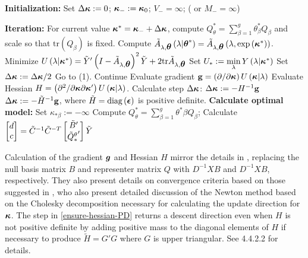 \begin{algorithm}[H]
\caption{ }
\begin{algorithmic}
\STATE \textbf{Initialization:} 
	\STATE Set $\Delta \mbox{\boldmath $\kappa$} := 0$; \;$\mbox{\boldmath $\kappa$}_{-}:=\mbox{\boldmath $\kappa$}_{0}$; \;$V_- = \infty$; \;( or $M_- = \infty$)

\STATE \textbf{Iteration:} 
		\STATE For current value $\mbox{\boldmath $\kappa$}^* = \mbox{\boldmath $\kappa$}_- + \Delta \mbox{\boldmath $\kappa$}$, compute $Q^*_\theta = \sum_{\beta = 1}^g \theta^*_\beta Q_\beta$ and scale so that $\mbox{tr}\left(Q_\beta\right)$ is fixed. 
		\STATE Compute $\tilde{A}_{\lambda,\mbox{\boldmath $\theta$}}\left(\lambda \vert \mbox{\boldmath $\theta$}^* \right) = \tilde{A}_{\lambda,\mbox{\boldmath $\theta$}}\left(\lambda, \exp\left({\mbox{\boldmath $\kappa$}^*} \right)\right)$.
		\STATE Minimize $U\left(\lambda \vert \mbox{\boldmath $\kappa$}^* \right) =  \tilde{Y}'\left( I - \tilde{A}_{\lambda,\mbox{\boldmath $\theta$}} \right)^2\tilde{Y} + 2\mbox{tr}\tilde{A}_{\lambda,\mbox{\boldmath $\theta$}} $
		\STATE Set $U_* := \min \limits_\lambda Y\left( \lambda \vert \mbox{\boldmath $\kappa$}^* \right) $
		 		\STATE Set $\Delta \mbox{\boldmath $\kappa$} := \Delta \mbox{\boldmath $\kappa$}/2$
		 		\STATE Go to (1).
		\ELSE
		\STATE Continue
		\ENDIF
		\STATE Evaluate gradient $\mathbf{g} = \left(\partial /\partial \mbox{\boldmath $\kappa$}\right) U\left(\mbox{\boldmath $\kappa$} \vert \lambda\right)$
		\STATE Evaluate Hessian $H = \left(\partial^2 /\partial \mbox{\boldmath $\kappa$}\partial \mbox{\boldmath $\kappa$}' \right) U\left(\mbox{\boldmath $\kappa$} \vert \lambda\right)$.
		\STATE Calculate step $\Delta \mbox{\boldmath $\kappa$}$:
				\STATE $\Delta \mbox{\boldmath $\kappa$} := -H^{-1} \mathbf{g}$
			\ELSE
				\STATE $\Delta \mbox{\boldmath $\kappa$} := -\tilde{H}^{-1} \mathbf{g}$, where $\tilde{H} = \textup{diag}\left(\mbox{\boldmath $\epsilon$}\right)$ is positive definite. \label{ensure-hessian-PD}
			\ENDIF
	\ENDWHILE
\STATE \textbf{Calculate optimal model:} 
		\STATE Set $\kappa_{*\beta} := -\infty$
	\ENDIF
	\STATE Compute $Q^*_\theta = \sum_{\beta = 1}^g \theta^*{\beta} Q_\beta$;
	\STATE Calculate $\begin{bmatrix} d \\ c \end{bmatrix} = \tilde{C}^{-1} \tilde{C}^{-T} \begin{bmatrix} \tilde{B}' \\ {\tilde{Q}_*^\theta}' \end{bmatrix} \tilde{Y}$
\end{algorithmic}
\end{algorithm}

Calculation of the gradient $\mbox{\boldmath $g$}$ and Hessian $H$ mirror the details in \cite{gu1991minimizing}, replacing the null basis matrix $B$ and representer matrix $Q$ with $D^{-1}XB$ and $D^{-1}XB$, respectively. They also present details on convergence criteria based on those suggested in \cite{gill1981practical}, who also present detailed discussion of the Newton method based on the Cholesky decomposition necessary for calculating the update direction for $\mbox{\boldmath $\kappa$}$. The step in \ref{ensure-hessian-PD} returns a descent direction even when $H$ is not positive definite by adding positive mass to the diagonal elements of $H$ if necessary to produce $\tilde{H} = G'G$ where $G$ is upper triangular. See \cite{gill1981practical} 4.4.2.2 for details. 
\bigskip

